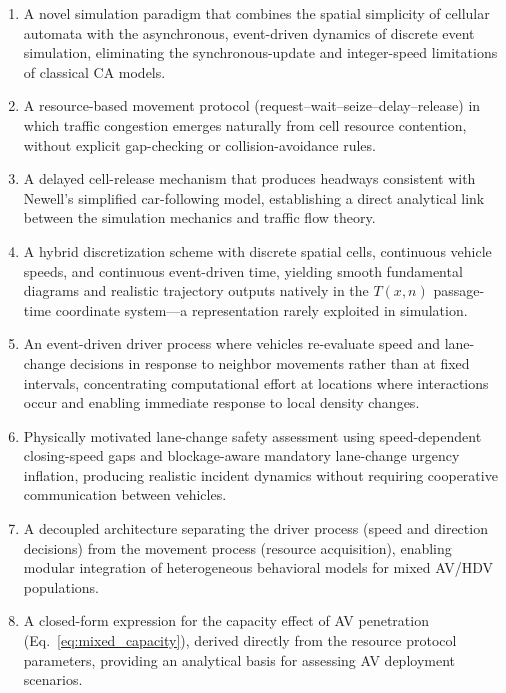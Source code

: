 \documentclass[review,authoryear]{elsarticle}
\begin{document}
\begin{enumerate}
    \item A novel simulation paradigm that combines the spatial simplicity of cellular automata with the asynchronous, event-driven dynamics of discrete event simulation, eliminating the synchronous-update and integer-speed limitations of classical CA models.

    \item A resource-based movement protocol (request--wait--seize--delay--release) in which traffic congestion emerges naturally from cell resource contention, without explicit gap-checking or collision-avoidance rules.

    \item A delayed cell-release mechanism that produces headways consistent with Newell's simplified car-following model, establishing a direct analytical link between the simulation mechanics and traffic flow theory.

    \item A hybrid discretization scheme with discrete spatial cells, continuous vehicle speeds, and continuous event-driven time, yielding smooth fundamental diagrams and realistic trajectory outputs natively in the $T(x,n)$ passage-time coordinate system---a representation rarely exploited in simulation.

    \item An event-driven driver process where vehicles re-evaluate speed and lane-change decisions in response to neighbor movements rather than at fixed intervals, concentrating computational effort at locations where interactions occur and enabling immediate response to local density changes.

    \item Physically motivated lane-change safety assessment using speed-dependent closing-speed gaps and blockage-aware mandatory lane-change urgency inflation, producing realistic incident dynamics without requiring cooperative communication between vehicles.

    \item A decoupled architecture separating the driver process (speed and direction decisions) from the movement process (resource acquisition), enabling modular integration of heterogeneous behavioral models for mixed AV/HDV populations.

    \item A closed-form expression for the capacity effect of AV penetration (Eq.~\ref{eq:mixed_capacity}), derived directly from the resource protocol parameters, providing an analytical basis for assessing AV deployment scenarios.
\end{enumerate}
\end{document}
